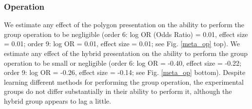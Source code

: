 \documentclass[man,mask,10pt]{apa6}
\begin{document}
\subsubsection{Operation}
We estimate any effect of the polygon presentation on the ability to perform the group operation to be negligible (order 6: log OR (Odds Ratio) = 0.01, effect size = 0.01; order 9: log OR = 0.01, effect size = 0.01; see Fig. \ref{meta_op} top). We estimate any effect of the hybrid presentation on the ability to perform the group operation to be small or negligible (order 6: log OR = -0.40, effect size = -0.22; order 9: log OR = -0.26, effect size = -0.14; see Fig. \ref{meta_op} bottom). Despite learning different methods for performing the group operation, the experimental groups do not differ substantially in their ability to perform it, although the hybrid group appears to lag a little. 
\end{document}
